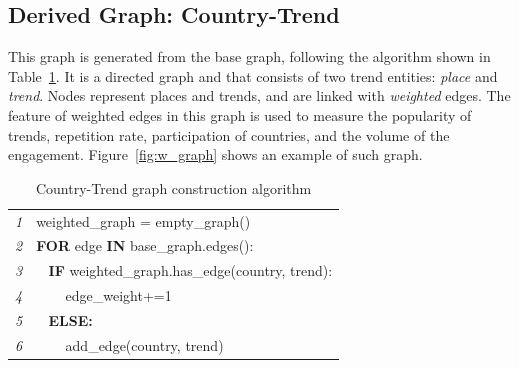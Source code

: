 \documentclass{comjnl}
\begin{document}
\subsection{Derived Graph: Country-Trend}

This graph is generated from the base graph, following the algorithm shown in Table~\ref{tbl:algorithm1}. It is a directed graph and that consists of two trend entities: {\emph{place}} and {\emph{trend}}. Nodes represent places and trends, and are linked with {\emph{weighted}} edges. The feature of weighted edges in this graph is used to measure the popularity of trends, repetition rate, participation of countries, and the volume of the engagement. Figure~\ref{fig:w_graph} shows an example of such graph.


\begin{table}
\centering
\begin{tabular}{l|l}
\hline
{\emph{1}} & weighted\_graph = empty\_graph()\\
{\emph{2}} & \textbf{FOR} edge \textbf{IN} base\_graph.edges():\\
{\emph{3}} &  $\>\>\>\>$\textbf{IF} weighted\_graph.has\_edge(country, trend):\\
{\emph{4}} &  $\>\>\>\>\>\>\>\>$ edge\_weight+=1\\
{\emph{5}} &  $\>\>\>\>$\textbf{ELSE:}\\
{\emph{6}} &  $\>\>\>\>\>\>\>\>$ add\_edge(country, trend)\\
\hline
\end{tabular}
\caption{Country-Trend graph construction algorithm}
\label{tbl:algorithm1}
\end{table}


\end{document}
